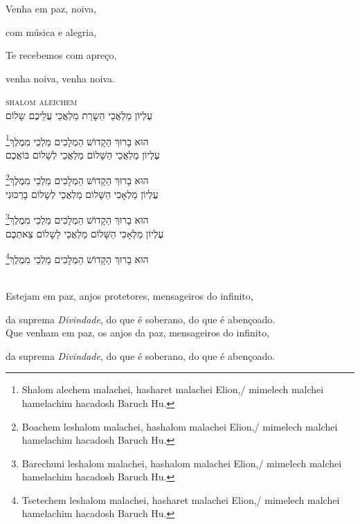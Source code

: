 Venha em paz, noiva,

com música e alegria,

Te recebemos com apreço,

venha noiva, venha noiva.

\movetoevenpage
\raggedleft
{}

\vspace*{1cm}

\textsc{shalom aleichem}\\[15pt]

עֶלְיוֹן מַלְאֲכֵי הַשָרֵת מַלְאֲכֵי עֲלֵיכֶם שָלוֹם

הוּא בָרוּךְ הַקָדוֹשׁ הַמְלָכִים מַלְכֵי מִמֶלֶךְ\footnote{Shalom alechem malachei, hasharet malachei Elion,/
mimelech malchei hamelachim hacadosh Baruch Hu.}\\[10pt]

עֶלְיוֹן מַלְאֲכֵי הַשָּׁלוֹם מַלְאֲכֵי לְשָׁלוֹם בּוֹאֲכֶם

הוּא בָרוּךְ הַקָדוֹשׁ הַמְלָכִים מַלְכֵי מִמֶלֶךְ\footnote{Boachem leshalom malachei, hashalom malachei Elion,/
mimelech malchei hamelachim hacadosh Baruch Hu.}\\[10pt]

עֶלְיוֹן מַלְאָכִי הַשָּׁלוֹם מַלְאֲכֵי לְשָלוֹם בָרְכוּנִי

הוּא בָרוּךְ הַקָדוֹשׁ הַמְלָכִים מַלְכֵי מִמֶלֶךְ\footnote{Barechuni leshalom malachei, hashalom malachei Elion,/
mimelech malchei hamelachim hacadosh Baruch Hu.}\\[10pt] 

עֶלְיוֹן מַלְאָכִי הַשָּׁלוֹם מַלְאֲכֵי לְשָלוֹם צֵאתְכֶם 

הוּא בָרוּךְ הַקָדוֹשׁ הַמְלָכִים מַלְכֵי מִמֶלֶךְ\footnote{Tsetechem leshalom malachei, hasharet malachei Elion,/
mimelech malchei hamelachim hacadosh Baruch Hu.} 


\movetooddpage
\raggedright

\vspace*{1cm}

\textsc{}\\[15pt]

Estejam em paz, anjos protetores, mensageiros do infinito,

da suprema \emph{Divindade},  do que é soberano, do que é \qb{}abençoado.\\[10pt]

Que venham em paz, os anjos da paz, mensageiros do \qb{}infinito,

da suprema \emph{Divindade}, do que é soberano, do que é \qb{}abençoado.\\[10pt]

